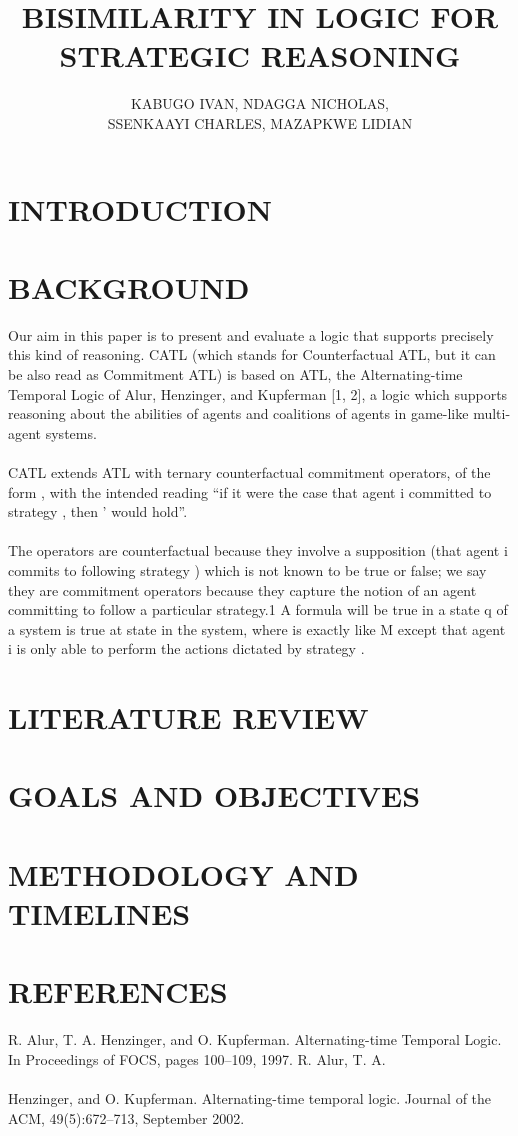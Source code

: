 \documentclass[10pt,a4paper]{article}
\begin{document}
\author{KABUGO IVAN, NDAGGA NICHOLAS,\\ SSENKAAYI CHARLES, MAZAPKWE LIDIAN}
\title{\textbf{BISIMILARITY IN LOGIC FOR STRATEGIC REASONING}}
\maketitle
\section{INTRODUCTION}

\section{BACKGROUND}	
Our aim in this paper is to present and evaluate a logic that supports precisely this kind of reasoning. CATL (which stands for Counterfactual ATL, but it can be also read as Commitment ATL) is based on ATL, the Alternating-time Temporal Logic of Alur, Henzinger, and Kupferman [1, 2], a logic which supports reasoning about the abilities of agents and coalitions of agents in game-like multi-agent systems.\\\\ CATL extends ATL with ternary counterfactual commitment operators, of the form , with the intended reading “if it were the case that agent i committed to strategy , then ' would hold”. \\\\The operators are counterfactual because they involve a supposition (that agent i commits to following strategy ) which is not known to be true or false; we say they are commitment operators because they capture the notion of an agent committing to follow a particular strategy.1 A formula will be true in a state q of a system  is true at state  in the system, where is exactly like M except that agent i is only able to perform the actions dictated by strategy .


\section{ LITERATURE REVIEW }
\section{GOALS AND OBJECTIVES}	


\section{METHODOLOGY AND TIMELINES}

\section{REFERENCES}


R. Alur, T. A. Henzinger, and O. Kupferman. Alternating-time Temporal Logic. In Proceedings of FOCS, pages 100–109, 1997.  R. Alur, T. A.\\\\Henzinger, and O. Kupferman.
Alternating-time temporal logic. Journal of the ACM, 49(5):672–713, September 2002.
 
	
\end{document}
